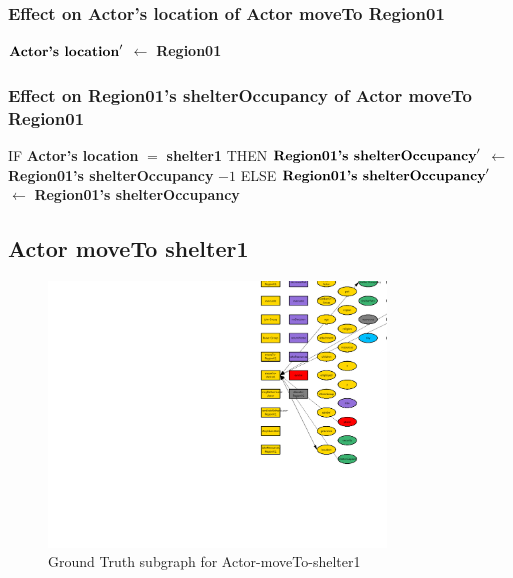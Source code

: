 \documentclass{article}%
\begin{document}
%
\subsubsection{Effect on Actor's location of Actor moveTo Region01}%
\label{ssubsec:Effect on Actor's location of Actor moveTo Region01}%
\begin{flushleft}%
$\mbox{\textbf{Actor's location}} '$%
$\leftarrow$%
\textbf{Region01}%
\end{flushleft}

%
\subsubsection{Effect on Region01's shelterOccupancy of Actor moveTo Region01}%
\label{ssubsec:Effect on Region01's shelterOccupancy of Actor moveTo Region01}%
\begin{flushleft}%
IF %
\textbf{Actor's location}%
$=$%
\textbf{shelter1}%
\linebreak%
\hspace*{2em}%
THEN %
$\mbox{\textbf{Region01's shelterOccupancy}} '$%
$\leftarrow$%
\textbf{Region01's shelterOccupancy}%
${-}1$%
\linebreak%
\hspace*{2em}%
ELSE %
$\mbox{\textbf{Region01's shelterOccupancy}} '$%
$\leftarrow$%
\textbf{Region01's shelterOccupancy}%
\end{flushleft}

%
\subsection{Actor moveTo shelter1}%
\label{subsec:Actor moveTo shelter1}%


\begin{figure}[ht]%
\centering%
\includegraphics[width=0.8\textwidth]{images/Actor-moveTo-shelter1.png}%
\caption{Ground Truth subgraph for Actor{-}moveTo{-}shelter1}%
\end{figure}
\end{document}
